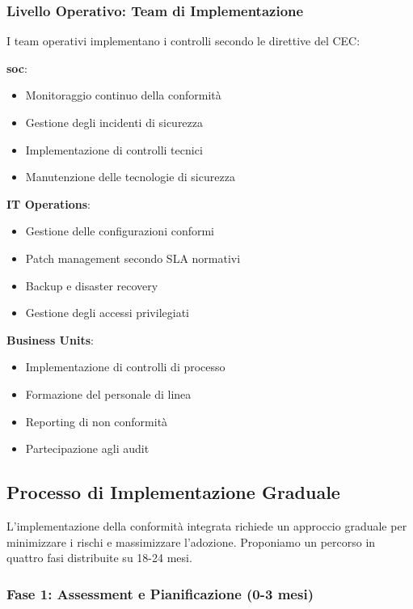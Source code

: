 \subsubsection{Livello Operativo: Team di Implementazione}

I team operativi implementano i controlli secondo le direttive del CEC:

\textbf{\gls{soc}}:
\begin{itemize}
    \item Monitoraggio continuo della conformità
    \item Gestione degli incidenti di sicurezza
    \item Implementazione di controlli tecnici
    \item Manutenzione delle tecnologie di sicurezza
\end{itemize}

\textbf{IT Operations}:
\begin{itemize}
    \item Gestione delle configurazioni conformi
    \item Patch management secondo SLA normativi
    \item Backup e disaster recovery
    \item Gestione degli accessi privilegiati
\end{itemize}

\textbf{Business Units}:
\begin{itemize}
    \item Implementazione di controlli di processo
    \item Formazione del personale di linea
    \item Reporting di non conformità
    \item Partecipazione agli audit
\end{itemize}

\subsection{Processo di Implementazione Graduale}
\label{subsec:4.6.2_implementazione}

L'implementazione della conformità integrata richiede un approccio graduale per minimizzare i rischi e massimizzare l'adozione. Proponiamo un percorso in quattro fasi distribuite su 18-24 mesi.

\subsubsection{Fase 1: Assessment e Pianificazione (0-3 mesi)}

